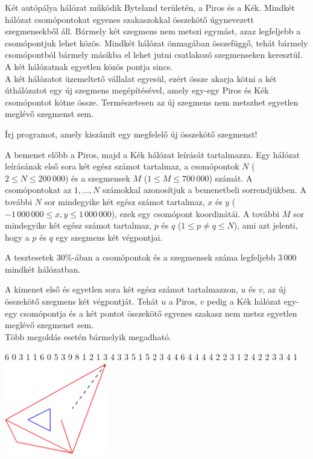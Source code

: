





Két autópálya hálózat működik Byteland területén, a Piros és a Kék. Mindkét hálózat csomópontokat egyenes szakaszokkal összekötő úgynevezett szegmensekből áll. Bármely két szegmens nem metszi egymást, azaz legfeljebb a csomópontjuk lehet közös. Mindkét hálózat önmagában összefüggő, tehát bármely csomópontból bármely másikba el lehet jutni csatlakozó szegmenseken keresztül.
A két hálózatnak egyetlen közös pontja sincs.\\
A két hálózatot üzemeltető vállalat egyesül, ezért össze akarja kötni a két úthálózatot egy új szegmens megépítésével, amely egy-egy Piros és Kék csomópontot kötne össze. Természetesen az új szegmens nem metszhet egyetlen meglévő szegmenst sem.

Írj programot, amely kiszámít egy megfelelő új összekötő szegmenst!

A bemenet előbb a Piros, majd a Kék hálózat leírását tartalmazza. Egy hálózat leírásának első sora két egész számot tartalmaz, a csomópontok $N$ ($2 \leq N \leq 200\,000$) és a szegmensek $M$ ($1 \leq M \leq 700\,000$) számát. A csomópontokat az $1,\ldots,N$  számokkal azonosítjuk a bemenetbeli sorrendjükben. A további $N$ sor mindegyike két egész számot tartalmaz, $x$ és $y$ ($-1\,000\,000 \leq x,y \leq 1\,000\,000$), ezek egy csomópont koordinátái. A további $M$ sor mindegyike két egész számot tartalmaz, $p$ és $q$ ($1\leq p \neq q \leq N$), ami azt jelenti, hogy a $p$ és $q$ egy szegmens két végpontjai.

\smallskip
 A tesztesetek $30\%$-ában a csomópontok és a szegmensek száma legfeljebb $3\, 000$ mindkét hálózatban.

A kimenet első és egyetlen sora két egész számot tartalmazzon, $u$ és $v$, az új összekötő szegmens két végpontját. Tehát $u$ a Piros, $v$ pedig a Kék hálózat egy-egy csomópontja és a két pontot összekötő egyenes szakasz nem metsz egyetlen meglévő szegmenst sem.\\
Több megoldás esetén bármelyik megadható.


 6
0 3
1 1
6 0
5 3
9 8
1 2
1 3
4 3
3 5
1 5
2 3
4 4
6 4
4 4
4 2
2 3
1 2
4 2
2 3
3 4
 1
\sampleCOMMENT
\includegraphics[height=4cm]{img/fig11.pdf}
\sampleEND


